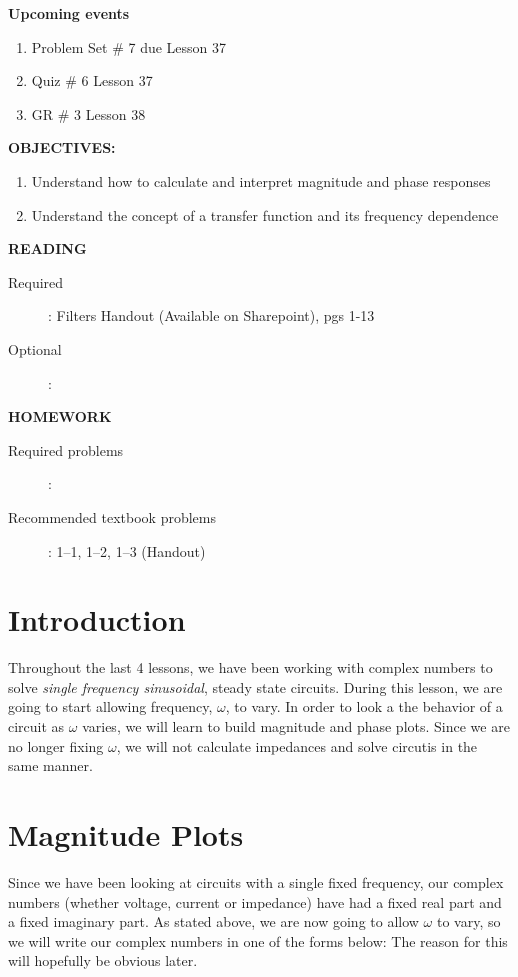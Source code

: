 \documentclass{handout}
\begin{document}
\maketitle

\textbf{Upcoming events}
\begin{enumerate}
\item Problem Set \# 7 due Lesson 37
\item Quiz \# 6 Lesson 37
\item GR \# 3 Lesson 38
\end{enumerate}

\textbf{OBJECTIVES:}
\begin{enumerate}
\item Understand how to calculate and interpret magnitude and phase responses
\item Understand the concept of a transfer function and its frequency dependence
\end{enumerate}

\textbf{READING}
\begin{description}
\item [Required]:
Filters Handout (Available on Sharepoint), pgs 1-13
\item [Optional]: 
\end{description}

\textbf{HOMEWORK}
\begin{description}
\item [Required problems]: 
\item [Recommended textbook problems]: 1--1, 1--2, 1--3 (Handout)
\end{description}

\section{Introduction}
Throughout the last 4 lessons, we have been working with complex numbers to solve {\em single frequency sinusoidal}, steady state circuits.  During this lesson, we are going to start allowing frequency, $\omega$, to vary.  In order to look a the behavior of a circuit as $\omega$ varies, we will learn to build magnitude and phase plots.  Since we are no longer fixing $\omega$, we will not calculate impedances and solve circutis in the same manner.

\section{Magnitude Plots}
Since we have been looking at circuits with a single fixed frequency, our complex numbers (whether voltage, current or impedance) have had a fixed real part and a fixed imaginary part. As stated above, we are now going to allow $\omega$ to vary, so we will write our complex numbers in one of the forms below:
 The reason for this will hopefully be obvious later.
 
\end{document}
